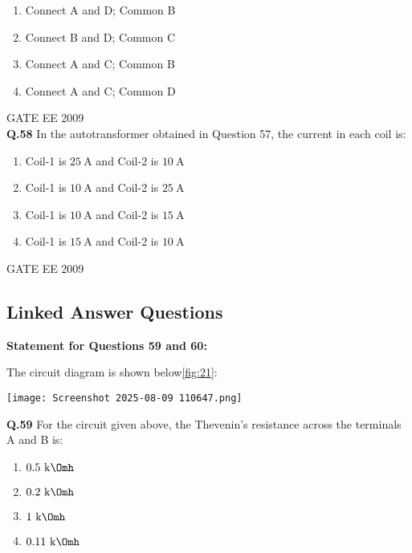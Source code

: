 \documentclass[12pt]{article}
\begin{document}
\begin{enumerate}
\item Connect A and D; Common B 
\item Connect B and D; Common C 
\item  Connect A and C; Common B 
\item  Connect A and C; Common D
\end{enumerate}

\vspace{0.7cm}
\hspace{10pt}
GATE EE 2009\\
\textbf{Q.58}  
In the autotransformer obtained in Question 57, the current in each coil is:

\begin{enumerate}
    
\item  Coil-1 is \(25 \ \mathrm{A}\) and Coil-2 is \(10 \ \mathrm{A}\) 
\item  Coil-1 is \(10 \ \mathrm{A}\) and Coil-2 is \(25 \ \mathrm{A}\) 
\item  Coil-1 is \(10 \ \mathrm{A}\) and Coil-2 is \(15 \ \mathrm{A}\) 
\item Coil-1 is \(15 \ \mathrm{A}\) and Coil-2 is \(10 \ \mathrm{A}\)
\end{enumerate}

\hspace{10pt}
GATE EE 2009\\
\subsection*{Linked Answer Questions}

\textbf{Statement for Questions 59 and 60:}

The circuit diagram is shown below\ref{fig:21}:

\begin{center}
\texttt{[image: Screenshot 2025-08-09 110647.png]}
\label{fig:21}
\end{center}

\vspace{0.5cm}

\textbf{Q.59} For the circuit given above, the Thevenin's resistance across the terminals A and B is:

\begin{enumerate}
    

\item \(0.5 \ \mathrm{k\Omh}\) 
\item  \(0.2 \ \mathrm{k\Omh}\) 
\item  \(1 \ \mathrm{k\Omh}\) 
\item  \(0.11 \ \mathrm{k\Omh}\)
\end{enumerate}
\end{document}
